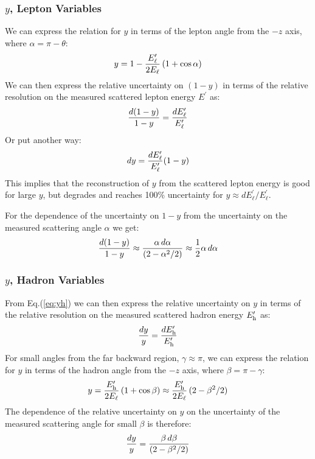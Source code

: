 \documentclass[12pt]{article}
\begin{document}
\subsubsection{$y$, Lepton Variables}

We can express the relation for $y$ in terms of the lepton angle from the $-z$ axis, where $\alpha = \pi - \theta$:
%
\begin{equation}
y = 1 - {E^\prime_\ell \over 2 E_\ell} \, (1+\cos\alpha)
\label{eq:Yalpha}
\end{equation}
%
We can then express the relative uncertainty on $(1-y)$ in terms of the relative resolution on the measured scattered lepton energy $E^\prime$ as:
%
\begin{equation}
{d(1-y) \over 1-y} = {dE^\prime_{\ell} \over E^\prime_{\ell}}
\end{equation}
%
Or put another way:
%
\begin{equation}
dy = {dE^\prime_{\ell} \over E^\prime_{\ell}}(1-y)
\end{equation}
%
This implies that the reconstruction of $y$ from the scattered lepton energy is good for large $y$, but degrades and reaches 100\% uncertainty for $y \approx dE^\prime_{\ell}/E^\prime_{\ell}$. 

For the dependence of the uncertainty on $1-y$ from the uncertainty on the measured scattering angle $\alpha$  we get:
%
\begin{equation}
{d(1-y) \over 1-y} \approx {\alpha\, d\alpha \over (2-\alpha^2/2)} \approx {1 \over 2} \alpha\, d\alpha 
\end{equation}
%


\subsubsection{$y$, Hadron Variables}

From Eq.(\ref{eq:yh}) we can then express the relative uncertainty on $y$ in terms of the relative resolution on the measured scattered hadron energy $E^\prime_{\rm h}$ as:
%
\begin{equation}
{dy \over y} = {dE^\prime_{\rm h} \over E^\prime_{\rm h}}
\end{equation}
%
For small angles from the far backward region, $\gamma \approx \pi$, we can express the relation for $y$ in terms of the hadron angle from the $-z$ axis, where $\beta = \pi - \gamma$:
%
\begin{equation}
y = {E^\prime_{\rm h} \over 2 E_\ell} \, (1+\cos\beta) \approx {E^\prime_{\rm h} \over 2 E_\ell} \, (2-\beta^2/2)
\end{equation}
%
The dependence of the relative uncertainty on $y$ on the uncertainty of the measured scattering angle for small $\beta$ is therefore:
%
\begin{equation}
{dy \over y} = {\beta\, d\beta \over (2-\beta^2/2)}
\end{equation}
%

%
\end{document}
